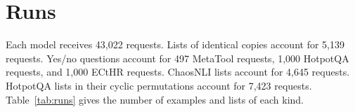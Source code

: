 \section{Runs}
\label{app:runs}
Each model receives 43,022 requests. Lists of identical copies account for 5,139 requests. Yes/no questions account for 497 MetaTool requests, 1,000 HotpotQA requests, and 1,000 ECtHR requests. ChaosNLI lists account for 4,645 requests. HotpotQA lists in their cyclic permutations account for 7,423 requests. Table~\ref{tab:runs} gives the number of examples and lists of each kind.

\begin{table}[t]
\caption{Examples by dataset and list type, with the number of lists or yes/no questions per model in parentheses where it differs. GPT-6 Luna Decisions refused some of them (Appendix~\ref{app:refusals}).}
\label{tab:runs}
\centering
\small

\end{table}
